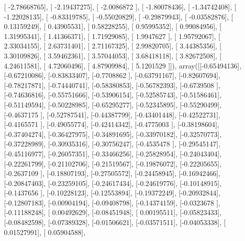 \documentclass{article}
\begin{document}
       [ -2.78668765],
       [ -2.19437275],
       [ -2.0086872 ],
       [ -1.80078436],
       [ -1.34742408],
       [ -1.22028135],
       [ -0.83319785],
       [ -0.55020829],
       [ -0.29879943],
       [ -0.03582876],
       [  0.13159249],
       [  0.43905531],
       [  0.58228255],
       [  0.95995352],
       [  0.99084956],
       [  1.31995341],
       [  1.41366371],
       [  1.71929085],
       [  1.9947627 ],
       [  1.95792067],
       [  2.33034155],
       [  2.63731401],
       [  2.71167325],
       [  2.99820705],
       [  3.44385356],
       [  3.30109826],
       [  3.59462361],
       [  3.57044053],
       [  3.68418118],
       [  3.82672508],
       [  4.24611581],
       [  4.72060496],
       [  4.87909984],
       [  5.1201529 ]]), array([[-0.65494136],
       [-0.67210086],
       [-0.83833407],
       [-0.7708862 ],
       [-0.63791167],
       [-0.82607694],
       [-0.78217871],
       [-0.74440741],
       [-0.58380853],
       [-0.56782393],
       [-0.6739508 ],
       [-0.74636816],
       [-0.55751666],
       [-0.53906154],
       [-0.52585743],
       [-0.51586461],
       [-0.51149594],
       [-0.50228985],
       [-0.65295277],
       [-0.52345895],
       [-0.55290499],
       [-0.4637175 ],
       [-0.52787541],
       [-0.44387799],
       [-0.43401448],
       [-0.42522731],
       [-0.4165571 ],
       [-0.49055774],
       [-0.42414342],
       [-0.4775003 ],
       [-0.38198604],
       [-0.37404274],
       [-0.36427975],
       [-0.34891695],
       [-0.33970182],
       [-0.32570773],
       [-0.37228989],
       [-0.30935316],
       [-0.30756247],
       [-0.4535478 ],
       [-0.29545147],
       [-0.45116977],
       [-0.26057351],
       [-0.33466256],
       [-0.25828954],
       [-0.24043404],
       [-0.22261799],
       [-0.21102706],
       [-0.21519567],
       [-0.19876072],
       [-0.22205655],
       [-0.2637109 ],
       [-0.18807193],
       [-0.27505572],
       [-0.24458945],
       [-0.16942466],
       [-0.20847403],
       [-0.23259105],
       [-0.24617434],
       [-0.24619776],
       [-0.10148915],
       [-0.1437656 ],
       [-0.10228123],
       [-0.12553894],
       [-0.19372249],
       [-0.20932844],
       [-0.12807183],
       [-0.00904194],
       [-0.09408798],
       [-0.14374159],
       [-0.0323678 ],
       [-0.11188248],
       [ 0.00492629],
       [-0.08451948],
       [ 0.00195511],
       [-0.05823433],
       [-0.08482598],
       [-0.07389328],
       [-0.01506621],
       [-0.03571511],
       [-0.04053338],
       [ 0.01527991],
       [ 0.05904588],
\end{document}
